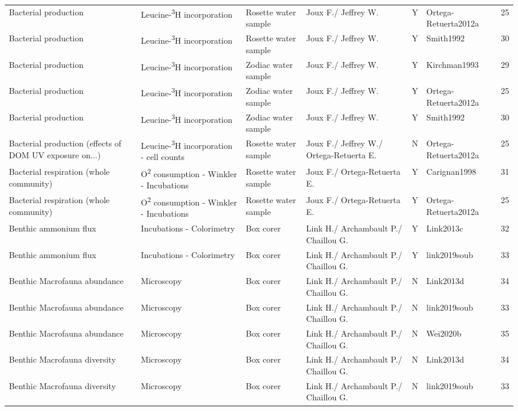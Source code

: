 \begin{ThreePartTable}
\begin{longtable}[t]{lllllll}
Bacterial production & Leucine-\textsuperscript{3}H incorporation & Rosette water sample & Joux F./ Jeffrey W. & Y & Ortega-Retuerta2012a & 25\\
\addlinespace
Bacterial production & Leucine-\textsuperscript{3}H incorporation & Rosette water sample & Joux F./ Jeffrey W. & Y & Smith1992 & 30\\
Bacterial production & Leucine-\textsuperscript{3}H incorporation & Zodiac water sample & Joux F./ Jeffrey W. & Y & Kirchman1993 & 29\\
Bacterial production & Leucine-\textsuperscript{3}H incorporation & Zodiac water sample & Joux F./ Jeffrey W. & Y & Ortega-Retuerta2012a & 25\\
Bacterial production & Leucine-\textsuperscript{3}H incorporation & Zodiac water sample & Joux F./ Jeffrey W. & Y & Smith1992 & 30\\
Bacterial production (effects of DOM UV exposure on...) & Leucine-\textsuperscript{3}H incorporation - cell counts & Rosette water sample & Joux F./ Jeffrey W./ Ortega-Retuerta E. & N & Ortega-Retuerta2012a & 25\\
\addlinespace
Bacterial respiration (whole community) & O\textsuperscript{2} consumption - Winkler - Incubations & Rosette water sample & Joux F./ Ortega-Retuerta E. & Y & Carignan1998 & 31\\
Bacterial respiration (whole community) & O\textsuperscript{2} consumption - Winkler - Incubations & Rosette water sample & Joux F./ Ortega-Retuerta E. & Y & Ortega-Retuerta2012a & 25\\
Benthic ammonium flux & Incubations - Colorimetry & Box corer & Link H./ Archambault P./ Chaillou G. & Y & Link2013c & 32\\
Benthic ammonium flux & Incubations - Colorimetry & Box corer & Link H./ Archambault P./ Chaillou G. & Y & link2019soub & 33\\
Benthic Macrofauna abundance & Microscopy & Box corer & Link H./ Archambault P./ Chaillou G. & N & Link2013d & 34\\
\addlinespace
Benthic Macrofauna abundance & Microscopy & Box corer & Link H./ Archambault P./ Chaillou G. & N & link2019soub & 33\\
Benthic Macrofauna abundance & Microscopy & Box corer & Link H./ Archambault P./ Chaillou G. & N & Wei2020b & 35\\
Benthic Macrofauna diversity & Microscopy & Box corer & Link H./ Archambault P./ Chaillou G. & N & Link2013d & 34\\
Benthic Macrofauna diversity & Microscopy & Box corer & Link H./ Archambault P./ Chaillou G. & N & link2019soub & 33\\

\end{longtable}
\end{ThreePartTable}
